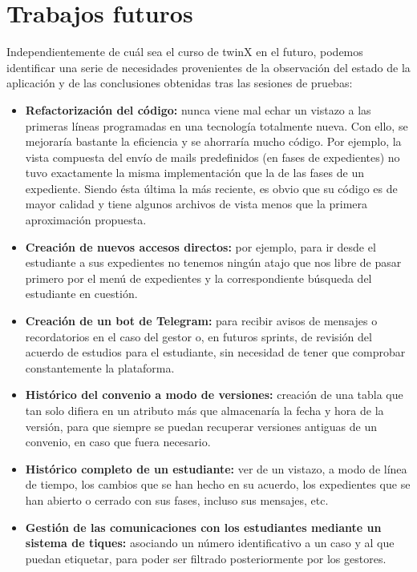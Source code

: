 \section{Trabajos futuros}

Independientemente de cuál sea el curso de twinX en el futuro, podemos identificar una serie de necesidades provenientes de la observación del estado de la aplicación y de las conclusiones obtenidas tras las sesiones de pruebas:

\begin{itemize}
	\item \textbf{Refactorización del código:} nunca viene mal echar un vistazo a las primeras líneas programadas en una tecnología totalmente nueva. Con ello, se mejoraría bastante la eficiencia y se ahorraría mucho código. Por ejemplo, la vista compuesta del envío de mails predefinidos (en fases de expedientes) no tuvo exactamente la misma implementación que la de las fases de un expediente. Siendo ésta última la más reciente, es obvio que su código es de mayor calidad y tiene algunos archivos de vista menos que la primera aproximación propuesta.
	\item \textbf{Creación de nuevos accesos directos:} por ejemplo, para ir desde el estudiante a sus expedientes no tenemos ningún atajo que nos libre de pasar primero por el menú de expedientes y la correspondiente búsqueda del estudiante en cuestión.
	\item \textbf{Creación de un bot de Telegram:} para recibir avisos de mensajes o recordatorios en el caso del gestor o, en futuros sprints, de revisión del acuerdo de estudios para el estudiante, sin necesidad de tener que comprobar constantemente la plataforma.
	\item \textbf{Histórico del convenio a modo de versiones:} creación de una tabla que tan solo difiera en un atributo más que almacenaría la fecha y hora de la versión, para que siempre se puedan recuperar versiones antiguas de un convenio, en caso que fuera necesario.
	\item \textbf{Histórico completo de un estudiante:} ver de un vistazo, a modo de línea de tiempo, los cambios que se han hecho en su acuerdo, los expedientes que se han abierto o cerrado con sus fases, incluso sus mensajes, etc.
	\item \textbf{Gestión de las comunicaciones con los estudiantes mediante un sistema de tiques:} asociando un número identificativo a un caso y al que puedan etiquetar, para poder ser filtrado posteriormente por los gestores.
\end{itemize}

